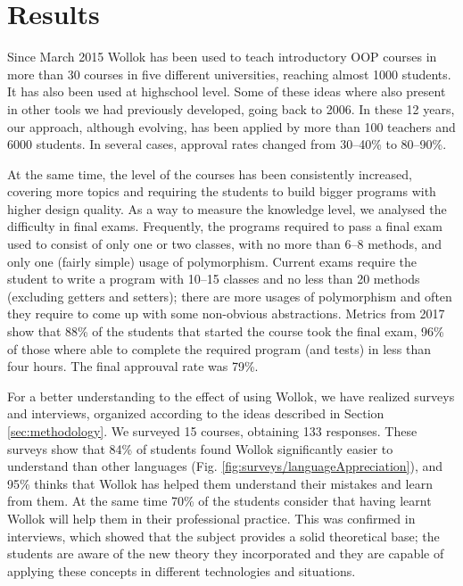 \section{Results}
\label{sec:results}
Since March 2015 Wollok has been used to teach introductory OOP courses 
in more than 30 courses in five different universities, reaching almost 1000 students.
It has also been used at highschool level.
Some of these ideas where also present in other tools we had previously developed, going back to 2006. 
In these 12 years, our approach, although evolving, 
has been applied by more than 100 teachers and 6000 students. 
In several cases, approval rates changed from 30--40\% to 80--90\%.



At the same time, the level of the courses has been consistently increased, 
covering more topics and requiring the students to build bigger programs with higher design quality.
As a way to measure the knowledge level, we analysed the difficulty in final exams.
Frequently, the programs required to pass a final exam used to consist of only one or two classes, 
with no more than 6--8 methods, and only one (fairly simple) usage of polymorphism.
Current exams require the student to write a program with 10--15 classes 
and no less than 20 methods (excluding getters and setters);
there are more usages of polymorphism 
and often they require to come up with some non-obvious abstractions.
Metrics from 2017 show that 88\% of the students that started the course took the final exam,
96\% of those where able to complete the required program (and tests) in less than four hours.
The final approuval rate was 79\%.

For a better understanding to the effect of using Wollok, 
we have realized surveys and interviews, organized according to the ideas described in Section \ref{sec:methodology}.
We surveyed 15 courses, obtaining 133 responses.
These surveys show that 84\% of students found Wollok significantly easier to understand than other languages (\cf Fig. \ref{fig:surveys/languageAppreciation}),
and 95\% thinks that Wollok has helped them understand their mistakes and learn from them.
At the same time 70\% of the students consider that having learnt Wollok will help them in their professional practice.
This was confirmed in interviews,
which showed that the subject provides a solid theoretical base;
the students are aware of the new theory they incorporated
and they are capable of applying these concepts in different technologies and situations.

